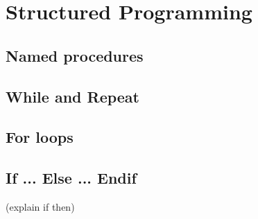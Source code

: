 \chapter{Structured Programming}

\section{Named procedures}

\section{While and Repeat}

\section{For loops }

\section{If ... Else ... Endif}

(explain if then)